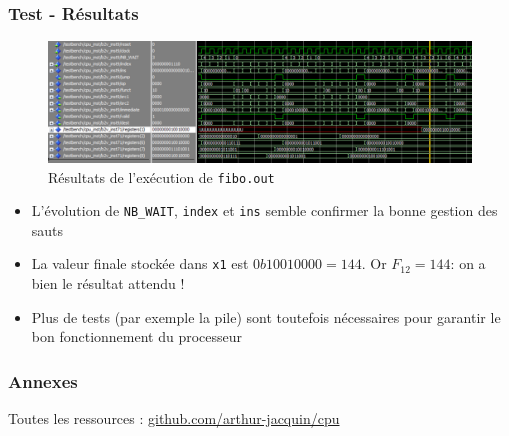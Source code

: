 \documentclass{beamer}
\begin{document}
\begin{frame}
\frametitle{Test - Résultats}
\begin{figure}
\centering
\includegraphics[width=\textwidth]{rapport/figures/simulation.png}
\caption{Résultats de l'exécution de \texttt{fibo.out}}
\end{figure}
\begin{itemize}
\item L'évolution de \texttt{NB\_WAIT}, \texttt{index} et \texttt{ins} semble
    confirmer la bonne gestion des sauts
\item La valeur finale stockée dans \texttt{x1} est $0b10010000 = 144$. Or
    $F_{12} = 144$: on a bien le résultat attendu !
\item Plus de tests (par exemple la pile) sont toutefois nécessaires pour
    garantir le bon fonctionnement du processeur
\end{itemize}
\end{frame}

\begin{frame}
\frametitle{Annexes}
\centering
Toutes les ressources : \url{github.com/arthur-jacquin/cpu}
\end{frame}
\end{document}
